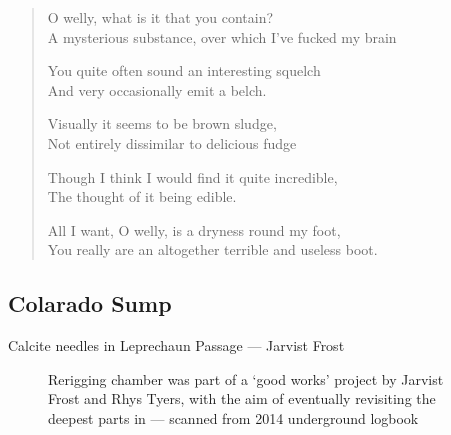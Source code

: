 \begin{verse}
\begin{centering}
 O welly, what is it that you contain?\\
A mysterious substance, over which I've fucked my brain

You quite often sound an interesting squelch\\
And very occasionally emit a belch.

Visually it seems to be brown sludge,\\
Not entirely dissimilar to delicious fudge

Though I think I would find it quite incredible,\\
The thought of it being edible.

All I want, O welly, is a dryness round my foot, \\
You really are an altogether terrible and useless boot.\\
 \end{centering}
\end{verse}

\subsection{Colarado Sump}
\begin{marginfigure}
\end{marginfigure}

       
\begin{marginfigure}
        \centering
        \caption{Calcite needles in Leprechaun Passage --- Jarvist Frost} \label{more calcite needles}
\end{marginfigure}

\begin{figure}[t]
	\checkoddpage \ifoddpage \forcerectofloat \else \forceversofloat \fi
    		\centering
    
   		\caption{Rerigging \protect{} chamber was part of a `good works' project by Jarvist Frost and Rhys Tyers, with the aim of eventually revisiting the deepest parts in \protect{}
    		 --- scanned from 2014 underground logbook}
		 \label{scan}
\end{figure}
          
